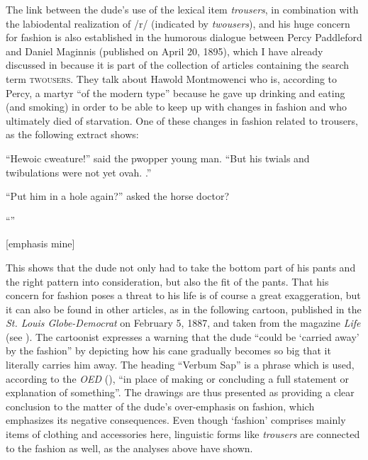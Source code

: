 The link between the dude’s use of the lexical item \emph{trousers}, in combination with the labiodental realization of /r/ (indicated by \emph{twousers}), and his huge concern for fashion is also established in the humorous dialogue between Percy Paddleford and Daniel Maginnis (published on April 20, 1895), which I have already discussed in  because it is part of the collection of articles containing the search term \textsc{twousers}. They talk about Hawold Montmowenci who is, according to Percy, a martyr “of the modern type” because he gave up drinking and eating (and smoking) in order to be able to keep up with changes in fashion and who ultimately died of starvation. One of these changes in fashion related to trousers, as the following extract shows:


\begin{ipquote}
“Hewoic cweature!” said the pwopper young man. “But his twials and twibulations were not yet ovah. .”

“Put him in a hole again?” asked the horse doctor?

{“”

\raggedleft
{[emphasis mine]}\\
}
\end{ipquote}


This shows that the dude not only had to take the bottom part of his pants and the right pattern into consideration, but also the fit of the pants. That his concern for fashion poses a threat to his life is of course a great exaggeration, but it can also be found in other articles, as in the following cartoon, published in the \emph{St. Louis Globe-Democrat} on February 5, 1887, and taken from the magazine \emph{Life} (see ). The cartoonist expresses a warning that the dude “could be ‘carried away’ by the fashion” by depicting how his cane gradually becomes so big that it literally carries him away. The heading “Verbum Sap” is a phrase which is used, according to the \emph{OED} (\citeyear{verbumsap}), “in place of making or concluding a full statement or explanation of something”. The drawings are thus presented as providing a clear conclusion to the matter of the dude's over-emphasis on fashion, which emphasizes its negative consequences. Even though ‘fashion’ comprises mainly items of clothing and accessories here, linguistic forms like \emph{trousers} are connected to the fashion as well, as the analyses above have shown.


